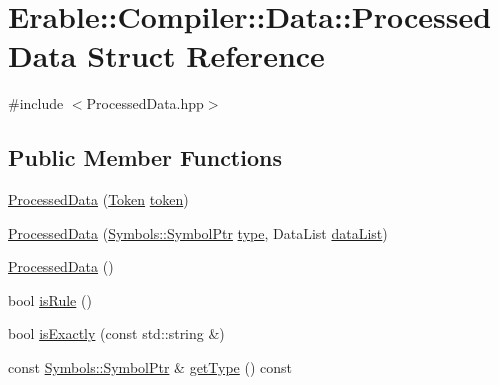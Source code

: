 \hypertarget{struct_erable_1_1_compiler_1_1_data_1_1_processed_data}{}\section{Erable\+::Compiler\+::Data\+::Processed\+Data Struct Reference}
\label{struct_erable_1_1_compiler_1_1_data_1_1_processed_data}


{\ttfamily \#include $<$Processed\+Data.\+hpp$>$}

\subsection*{Public Member Functions}
\begin{DoxyCompactItemize}
\item 
\mbox{\hyperlink{struct_erable_1_1_compiler_1_1_data_1_1_processed_data_afc450ed6a4ce4a3525ef81782970b970}{Processed\+Data}} (\mbox{\hyperlink{struct_token}{Token}} \mbox{\hyperlink{struct_erable_1_1_compiler_1_1_data_1_1_processed_data_acca79c74d6614ba873b4699b56550fc2}{token}})
\item 
\mbox{\hyperlink{struct_erable_1_1_compiler_1_1_data_1_1_processed_data_af4bfb8e8fdd44a61011d7da06e5a8a66}{Processed\+Data}} (\mbox{\hyperlink{namespace_erable_1_1_compiler_1_1_symbols_a8f0bc762f448ea4d84e8713ab3e140b9}{Symbols\+::\+Symbol\+Ptr}} \mbox{\hyperlink{struct_erable_1_1_compiler_1_1_data_1_1_processed_data_a891ed9e3f277ec69809cd3153da88a9c}{type}}, Data\+List \mbox{\hyperlink{struct_erable_1_1_compiler_1_1_data_1_1_processed_data_a3b56a46346d13ce73a9920b66ec79ce6}{data\+List}})
\item 
\mbox{\hyperlink{struct_erable_1_1_compiler_1_1_data_1_1_processed_data_ac596f4a8c91ab9f3f96fcf909fc8721e}{Processed\+Data}} ()
\item 
bool \mbox{\hyperlink{struct_erable_1_1_compiler_1_1_data_1_1_processed_data_a8229ce3083bc485691ea7466b9ce906c}{is\+Rule}} ()
\item 
bool \mbox{\hyperlink{struct_erable_1_1_compiler_1_1_data_1_1_processed_data_acd4e1bb37ed0c9f344d71df0c6065951}{is\+Exactly}} (const std\+::string \&)
\item 
const \mbox{\hyperlink{namespace_erable_1_1_compiler_1_1_symbols_a8f0bc762f448ea4d84e8713ab3e140b9}{Symbols\+::\+Symbol\+Ptr}} \& \mbox{\hyperlink{struct_erable_1_1_compiler_1_1_data_1_1_processed_data_a91b8c6ec271cccf9a89dc1e68385d98b}{get\+Type}} () const
\item 

\end{DoxyCompactItemize}
